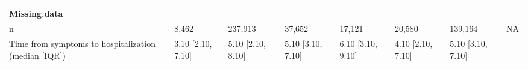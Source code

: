 \documentclass[10pt,letterpaper]{article}
\begin{document}
\begin{longtable}[]{@{}lllllllr@{}}
\begin{minipage}[b]{0.05\columnwidth}
Missing.data\strut
\end{minipage}\tabularnewline
\midrule
\endhead
\begin{minipage}[t]{0.20\columnwidth}\raggedright
n\strut
\end{minipage} & \begin{minipage}[t]{0.09\columnwidth}\raggedright
8,462\strut
\end{minipage} & \begin{minipage}[t]{0.08\columnwidth}\raggedright
237,913\strut
\end{minipage} & \begin{minipage}[t]{0.08\columnwidth}\raggedright
37,652\strut
\end{minipage} & \begin{minipage}[t]{0.11\columnwidth}\raggedright
17,121\strut
\end{minipage} & \begin{minipage}[t]{0.09\columnwidth}\raggedright
20,580\strut
\end{minipage} & \begin{minipage}[t]{0.08\columnwidth}\raggedright
139,164\strut
\end{minipage} & \begin{minipage}[t]{0.05\columnwidth}\raggedleft
NA\strut
\end{minipage}\tabularnewline
\begin{minipage}[t]{0.20\columnwidth}\raggedright
Time from symptoms to hospitalization (median {[}IQR{]})\strut
\end{minipage} & \begin{minipage}[t]{0.09\columnwidth}\raggedright
3.10 {[}2.10, 7.10{]}\strut
\end{minipage} & \begin{minipage}[t]{0.08\columnwidth}\raggedright
5.10 {[}2.10, 8.10{]}\strut
\end{minipage} & \begin{minipage}[t]{0.08\columnwidth}\raggedright
5.10 {[}3.10, 7.10{]}\strut
\end{minipage} & \begin{minipage}[t]{0.11\columnwidth}\raggedright
6.10 {[}3.10, 9.10{]}\strut
\end{minipage} & \begin{minipage}[t]{0.09\columnwidth}\raggedright
4.10 {[}2.10, 7.10{]}\strut
\end{minipage} & \begin{minipage}[t]{0.08\columnwidth}\raggedright
5.10 {[}3.10, 7.10{]}\strut
\end{minipage} & \begin{minipage}[t]{0.05\columnwidth}\raggedleft

\end{minipage}
\end{longtable}
\end{document}
